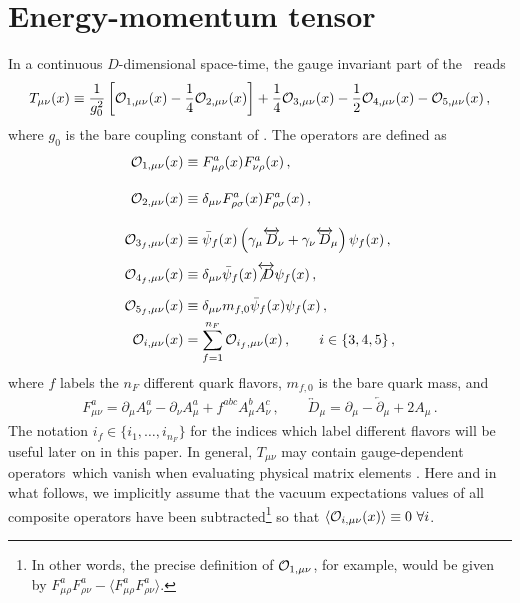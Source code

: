 \section{Energy-momentum tensor}\label{sec:emt}

In a continuous $D$-dimensional space-time, the gauge invariant part of the
\emt\ reads
\begin{equation}
  \begin{split}
    T_{\mu\nu}(x) \equiv \frac{1}{g_0^2}\left[
      \mathcal{O}_{1,\mu\nu}(x)-\frac{1}{4}\mathcal{O}_{2,\mu\nu}(x)\right]
    + \frac{1}{4} \mathcal{O}_{3,\mu\nu}(x)
    - \frac{1}{2} \mathcal{O}_{4,\mu\nu}(x)
    - \mathcal{O}_{5 ,\mu\nu}(x) \,,
    \label{eq:emt}
  \end{split}
\end{equation}
where $g_0$ is the bare coupling constant of \qcd. The operators are
defined as
\begin{equation}
  \begin{split}
    \mathcal{O}_{1,\mu\nu}(x) &\equiv
    F_{\mu\rho}^a(x)F_{\nu\rho}^a(x)\,,\\[10pt] \mathcal{O}_{2,\mu\nu}(x)
    &\equiv
    \delta_{\mu\nu}F_{\rho\sigma}^a(x)F_{\rho\sigma}^a(x)\,,\\[10pt]
    \mathcal{O}_{3_f,\mu\nu}(x) &\equiv
    \bar\psi_{f}(x)\left(\gamma_\mu\overleftrightarrow{D}\!_\nu
    +\gamma_\nu\overleftrightarrow{D}\!_\mu\right)\psi_{f}(x)\,,\\
    \mathcal{O}_{4_f,\mu\nu}(x)
    &\equiv \delta_{\mu\nu}\bar\psi_{f}(x)
    \overleftrightarrow{\not{D}}\psi_{f}(x)\,,\phantom{\bigg(\bigg)}\\
    \mathcal{O}_{5_f,\mu\nu}(x)
    &\equiv \delta_{\mu\nu}
    m_{f,0}\bar\psi_{f}(x)\psi_{f}(x)\,,\\
    \mathcal{O}_{i,\mu\nu}(x) &=
    \sum_{f=1}^{n_F}\mathcal{O}_{i_f,\mu\nu}(x)\,,\qquad i\in\{3,4,5\}\,,
    \label{eq:ops}
  \end{split}
\end{equation}
where $f$ labels the $n_F$ different quark flavors, $m_{f,0}$ is the
bare quark mass, and
\begin{equation}
  \begin{split}
    F^a_{\mu\nu} = \partial_\mu A_\nu^a - \partial_\nu A_\mu^a +
    f^{abc}A_\mu^bA_\nu^c\,,\qquad
    \overleftrightarrow{D}\!_\mu = \partial_\mu -
    \overleftarrow{\partial}\!_\mu + 2A_\mu\,.
  \end{split}
\end{equation}
The notation $i_f\in\{i_1,\ldots,i_{n_F}\}$ for the indices which label
different flavors will be useful later on in this paper.  In general,
$T_{\mu\nu}$ may contain gauge-dependent operators\, which vanish when
evaluating physical matrix elements \cite{Nielsen:1977sy}. Here and in
what follows, we implicitly assume that the vacuum expectations values
of all composite operators have been subtracted\footnote{In other words,
  the precise definition of $\mathcal{O}_{1,\mu\nu}$, for example, would be
  given by $F_{\mu\rho}^aF_{\rho\nu}^a-\langle
  F_{\mu\rho}^aF_{\rho\nu}^a\rangle$.} so that $\langle
\mathcal{O}_{i,\mu\nu}(x)\rangle\equiv 0\ \forall i$.


